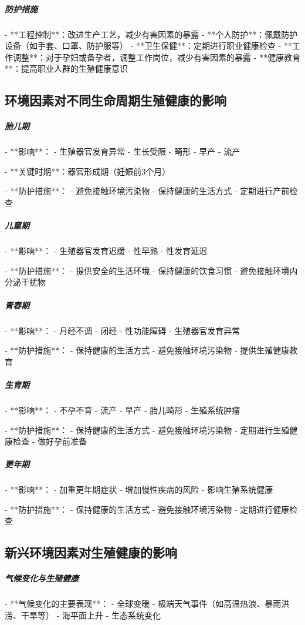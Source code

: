 \begin{enumerate}
\subparagraph{防护措施}

- **工程控制**：改进生产工艺，减少有害因素的暴露
- **个人防护**：佩戴防护设备（如手套、口罩、防护服等）
- **卫生保健**：定期进行职业健康检查
- **工作调整**：对于孕妇或备孕者，调整工作岗位，减少有害因素的暴露
- **健康教育**：提高职业人群的生殖健康意识

\subsection{环境因素对不同生命周期生殖健康的影响}

\subparagraph{胎儿期}

- **影响**：
  - 生殖器官发育异常
  - 生长受限
  - 畸形
  - 早产
  - 流产

- **关键时期**：器官形成期（妊娠前3个月）

- **防护措施**：
  - 避免接触环境污染物
  - 保持健康的生活方式
  - 定期进行产前检查

\subparagraph{儿童期}

- **影响**：
  - 生殖器官发育迟缓
  - 性早熟
  - 性发育延迟

- **防护措施**：
  - 提供安全的生活环境
  - 保持健康的饮食习惯
  - 避免接触环境内分泌干扰物

\subparagraph{青春期}

- **影响**：
  - 月经不调
  - 闭经
  - 性功能障碍
  - 生殖器官发育异常

- **防护措施**：
  - 保持健康的生活方式
  - 避免接触环境污染物
  - 提供生殖健康教育

\subparagraph{生育期}

- **影响**：
  - 不孕不育
  - 流产
  - 早产
  - 胎儿畸形
  - 生殖系统肿瘤

- **防护措施**：
  - 保持健康的生活方式
  - 避免接触环境污染物
  - 定期进行生殖健康检查
  - 做好孕前准备

\subparagraph{更年期}

- **影响**：
  - 加重更年期症状
  - 增加慢性疾病的风险
  - 影响生殖系统健康

- **防护措施**：
  - 保持健康的生活方式
  - 避免接触环境污染物
  - 定期进行健康检查

\subsection{新兴环境因素对生殖健康的影响}

\subparagraph{气候变化与生殖健康}

- **气候变化的主要表现**：
  - 全球变暖
  - 极端天气事件（如高温热浪、暴雨洪涝、干旱等）
  - 海平面上升
  - 生态系统变化


\end{enumerate}
